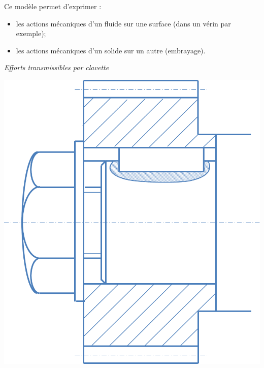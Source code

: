 \documentclass[10pt]{article}
\begin{document}
\begin{rem}
Ce modèle permet d'exprimer :
\begin{itemize}
\item les actions mécaniques d'un fluide sur une surface (dans un vérin par exemple);
\item les actions mécaniques d'un solide sur un autre (embrayage).
\end{itemize}
\end{rem}

\begin{exemple}
\textit{Efforts transmissibles par clavette}

\includegraphics[width=.25\textwidth]{images/clavette}
\end{exemple}
\end{document}
